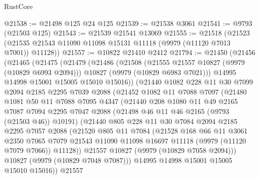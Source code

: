\begin{lexlean}{RustCore}
\begin{coremodule}
@21538 := @21498 @125 @24 @125
@21539 := @21538 @3061
@21541 := @9793 (@21503 @125)
@21543 := @21539 @21541 @13069
@21555 := @21518
    (@21523 (@21535 @21543 @11090 @11098 @15131 @11118 (@9979 (@11120 @7013 @7001)) @11128))
@21557 := @10822 @21410 @2412
@21794 := @21450
    (@21456
      (@21465
        (@21475
          (@21479
            (@21486
              (@21508
                (@21555 @21557 @10827 (@9979 (@10829 @6993 @2094)))
                @10827
                (@9979 (@10829 @6983 @7021)))
              @14995
              @14998
              @15001
              @15005
              @15010
              @15016))
          (@21440
            @1082
            @228
            @11
            @30
            @7099
            @2094
            @2185
            @2295
            @7039
            @2088
            (@21452
              @1082
              @11
              @7088
              @7097
              (@21480
                @1081
                @50
                @11
                @7088
                @7095
                @4347
                (@21440
                  @208
                  @1080
                  @11
                  @49
                  @2165
                  @7087
                  @7094
                  @2295
                  @7047
                  @2088
                  (@21498 @46 @11 @46 @2165 (@9793 (@21503 @46)) @10191)
                  (@21440
                    @805
                    @228
                    @11
                    @30
                    @7084
                    @2094
                    @2185
                    @2295
                    @7057
                    @2088
                    (@21520
                      @805
                      @11
                      @7084
                      (@21528
                        @168
                        @66
                        @11
                        @3061
                        @2350
                        @7065
                        @7079
                        @21543
                        @11090
                        @11098
                        @16697
                        @11118
                        (@9979 (@11120 @7079 @7066))
                        @11128))
                    @21557
                    @10827
                    (@9979 (@10829 @7058 @2094)))
                  @10827
                  (@9979 (@10829 @7048 @7087)))
                @14995
                @14998
                @15001
                @15005
                @15010
                @15016))
            @21557

\end{coremodule}
\end{lexlean}
